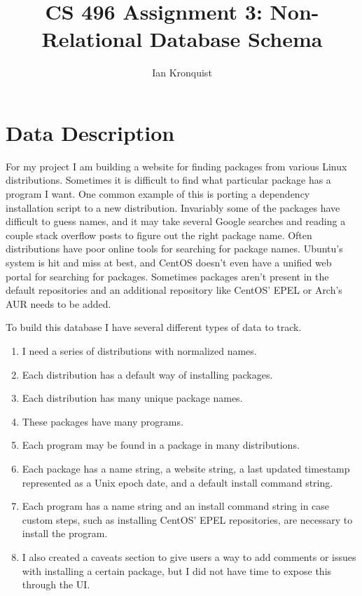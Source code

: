 \documentclass[12pt]{article}
\title{CS 496 Assignment 3: Non-Relational Database Schema}
\author{Ian Kronquist}
\begin{document}
\maketitle


\section{Data Description}
For my project I am building a website for finding packages from various Linux distributions. Sometimes it is difficult to find what particular package has a program I want. One common example of this is porting a dependency installation script to a new distribution. Invariably some of the packages have difficult to guess names, and it may take several Google searches and reading a couple stack overflow posts to figure out the right package name. Often distributions have poor online tools for searching for package names. Ubuntu's system is hit and miss at best, and CentOS doesn't even have a unified web portal for searching for packages. Sometimes packages aren't present in the default repositories and an additional repository like CentOS' EPEL or Arch's AUR needs to be added.

To build this database I have several different types of data to track.

\begin{enumerate}
    \item I need a series of distributions with normalized names.
    \item Each distribution has a default way of installing packages.
    \item Each distribution has many unique package names.
    \item These packages have many programs.
    \item Each program may be found in a package in many distributions.
    \item Each package has a name string, a website string, a last updated timestamp represented as a Unix epoch date, and a default install command string.
    \item Each program has a name string and an install command string in case custom steps, such as installing CentOS' EPEL repositories, are necessary to install the program.
    \item I also created a caveats section to give users a way to add comments or issues with installing a certain package, but I did not have time to expose this through the UI.
\end{enumerate}
\end{document}
